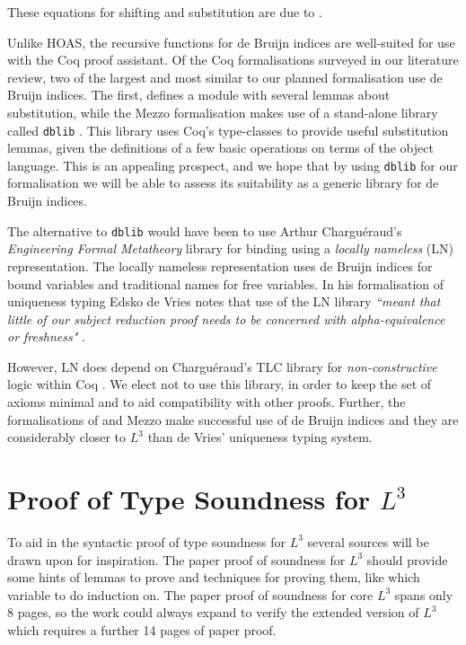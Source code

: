 \documentclass[]{unswthesis}
\newcommand{\SSPHS}{\text{SSPHS }}
\let\c\texttt
\begin{document}
These equations for shifting and substitution are due to \cite{tapl}.

Unlike HOAS, the recursive functions for de Bruijn indices are well-suited for use with the Coq proof assistant. Of the Coq formalisations surveyed in our literature review, two of the largest and most similar to our planned formalisation use de Bruijn indices. The first, \SSPHS \cite{pottier13} defines a module with several lemmas about substitution, while the Mezzo formalisation \cite{mezzo14} makes use of a stand-alone library called \c{dblib} \cite{dblib13}. This library uses Coq's type-classes to provide useful substitution lemmas, given the definitions of a few basic operations on terms of the object language. This is an appealing prospect, and we hope that by using \c{dblib} for our formalisation we will be able to assess its suitability as a generic library for de Bruijn indices.

The alternative to \c{dblib} would have been to use Arthur Chargu\'{e}raud's \textit{Engineering Formal Metatheory} library \cite{aydemir08} for binding using a \textit{locally nameless} (LN) representation. The locally nameless representation uses de Bruijn indices for bound variables and traditional names for free variables. In his formalisation of uniqueness typing Edsko de Vries notes that use of the LN library \textit{``meant that little of our subject reduction proof needs to be concerned with alpha-equivalence or freshness"} \cite{deVries07}.

However, LN does depend on Chargu\'{e}raud's TLC library for \textit{non-constructive} logic within Coq \cite{tlc15}. We elect not to use this library, in order to keep the set of axioms minimal and to aid compatibility with other proofs. Further, the formalisations of \SSPHS and Mezzo make successful use of de Bruijn indices and they are considerably closer to $L^3$ than de Vries' uniqueness typing system.

\section{Proof of Type Soundness for $L^3$}
\label{sec:proof_proposal}

To aid in the syntactic proof of type soundness for $L^3$ several sources will be drawn upon for inspiration. The paper proof of soundness for $L^3$ should provide some hints of lemmas to prove and techniques for proving them, like which variable to do induction on. The paper proof of soundness for core $L^3$ spans only 8 pages, so the work could always expand to verify the extended version of $L^3$ which requires a further 14 pages of paper proof.
\end{document}
